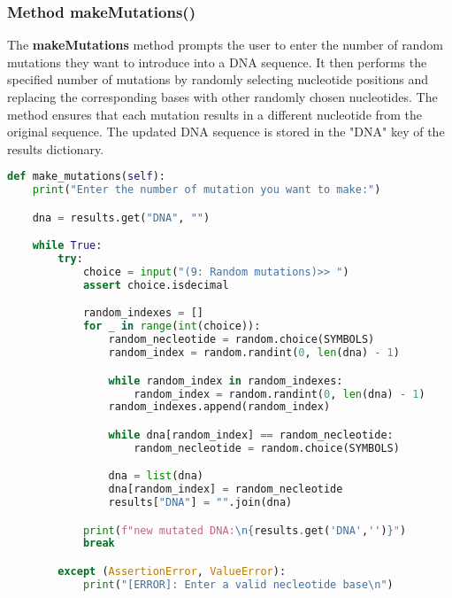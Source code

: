 \documentclass[11pt]{article}
\begin{document}
\subsubsection{Method makeMutations()}
The \textbf{makeMutations} method prompts the user to enter the number of random mutations they want to introduce into a DNA sequence. It then performs the specified number of mutations by randomly selecting nucleotide positions and replacing the corresponding bases with other randomly chosen nucleotides. The method ensures that each mutation results in a different nucleotide from the original sequence. The updated DNA sequence is stored in the "DNA" key of the results dictionary.
\begin{lstlisting}[language=Python, style=PythonStyle]
def make_mutations(self):
    print("Enter the number of mutation you want to make:")

    dna = results.get("DNA", "")

    while True:
        try:
            choice = input("(9: Random mutations)>> ")
            assert choice.isdecimal

            random_indexes = []
            for _ in range(int(choice)):
                random_necleotide = random.choice(SYMBOLS)
                random_index = random.randint(0, len(dna) - 1)

                while random_index in random_indexes:
                    random_index = random.randint(0, len(dna) - 1)
                random_indexes.append(random_index)

                while dna[random_index] == random_necleotide:
                    random_necleotide = random.choice(SYMBOLS)

                dna = list(dna)
                dna[random_index] = random_necleotide
                results["DNA"] = "".join(dna)

            print(f"new mutated DNA:\n{results.get('DNA','')}")
            break

        except (AssertionError, ValueError):
            print("[ERROR]: Enter a valid necleotide base\n")
\end{lstlisting}
\end{document}
